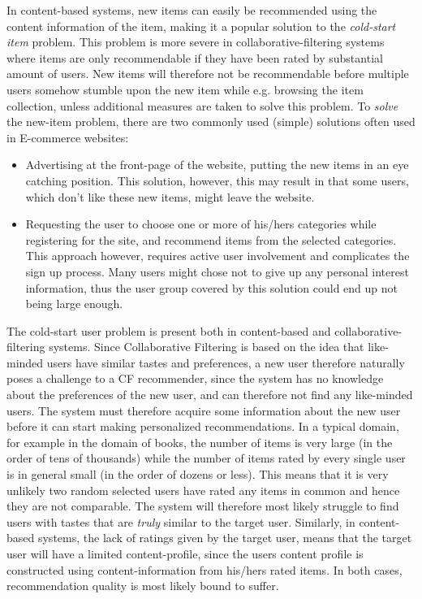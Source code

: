 In content-based systems, new items can easily be recommended using the content
information of the item, making it a popular solution to the \emph{cold-start
item} problem. This problem is more severe in collaborative-filtering systems
where items are only recommendable if they have been rated by substantial
amount of users. New items will therefore not be recommendable before multiple
users somehow stumble upon the new item while e.g. browsing the item
collection, unless additional measures are taken to solve this problem. To
\emph{solve} the new-item problem, there are two commonly used (simple)
solutions often used in E-commerce websites:

\begin{itemize}
\item Advertising at the front-page of the website, putting the new items in an
eye catching position. This solution, however, this may result in that some
users, which don't like these new items, might leave the website.
\item Requesting the user to choose one or more of his/hers categories while
registering for the site, and recommend items from the selected categories.
This approach however, requires active user involvement and complicates the
sign up process. Many users might chose not to give up any personal interest
information, thus the user group covered by this solution could end up not
being large enough.
\end{itemize}

The cold-start user problem is present both in content-based and collaborative-filtering systems.
Since Collaborative Filtering is based on the idea that like-minded users have similar tastes and
preferences, a new user therefore naturally poses a challenge to a CF recommender, since the system has no knowledge about
the preferences of the new user, and can therefore not find any like-minded users. The system must therefore acquire some
information about the new user before it can start making personalized recommendations. In a typical domain, for example
in the domain of books, the number of items is very large (in the order of tens of thousands) while the number of items
rated by every single user is in general small (in the order of dozens or less). This means that it is very unlikely two
random selected users have rated any items in common and hence they are not comparable. The system will therefore most
likely struggle to find users with tastes that are \emph{truly} similar to the target user. Similarly, in content-based
systems, the lack of ratings given by the target user, means that the target user will have a limited content-profile,
since the users content profile is constructed using content-information from his/hers rated items. In both cases,
recommendation quality is most likely bound to suffer.\newline

